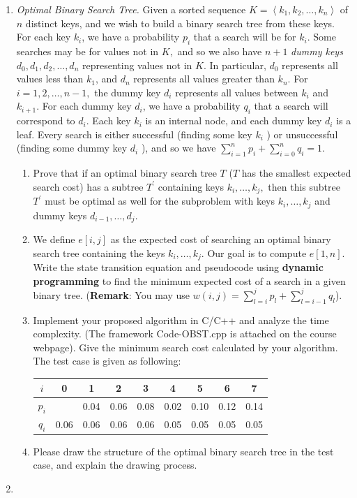 \documentclass[12pt,a4paper]{article}
\makeatletter
\newtheorem*{solution}{Solution}
\theoremstyle{definition}
\renewenvironment{solution}[1][Solution] {\par\pushQED{\qed}\normalfont\topsep6\p@\@plus6\p@\relax\trivlist\item[\hskip\labelsep\bfseries#1\@addpunct{.}]\ignorespaces}{\popQED\endtrivlist\@endpefalse} \makeatother
\makeatother
\begin{document}
	\begin{enumerate}
		\item \textit{Optimal Binary Search Tree.} Given a sorted sequence $K=\left \langle k_{1}, k_{2}, \ldots, k_{n} \right \rangle$ of $n$ distinct keys, and we wish to build a binary search tree from these keys. For each key $k_{i}$, we have a probability $p_{i}$ that a search will be for $k_{i}$. Some searches may be for values not in $K,$ and so we also have $n+1$ \emph{dummy keys} $d_{0}, d_{1}, d_{2}, \ldots, d_{n}$ representing values not in $K$. In particular, $d_{0}$ represents all values less than $k_{1}$, and $d_{n}$ represents all values greater than $k_{n}$. For $i=1,2, \ldots, n-1,$ the dummy key $d_{i}$ represents all values between $k_{i}$ and $k_{i+1}$. For each dummy key $d_{i}$, we have a probability $q_{i}$ that a search will correspond to $d_{i}$. Each key $k_{i}$ is an internal node, and each dummy key $d_{i}$ is a leaf. Every search is either successful (finding some key $k_{i}$ ) or unsuccessful (finding some dummy key $d_{i}$ ), and so we have $ \sum_{i=1}^{n} p_{i}+\sum_{i=0}^{n} q_{i}=1 $. 
		\begin{enumerate}
			\item Prove that if an optimal binary search tree $T$ ($ T $ has the smallest expected search cost) has a subtree $T^{\prime}$ containing keys $k_{i}, \ldots, k_{j},$ then this subtree $T^{\prime}$ must be optimal as well for the subproblem with keys $k_{i}, \ldots, k_{j}$ and dummy keys $d_{i-1}, \ldots, d_{j}$. 
			\item We define $e[i, j]$ as the expected cost of searching an optimal binary search tree containing the keys $k_{i}, \ldots, k_{j} .$ Our goal is to compute $e[1, n]$. Write the state transition equation and pseudocode using \textbf{dynamic programming} to find
			the minimum expected cost of a search in a given binary tree. (\textbf{Remark}: You may use $ w(i, j)=\sum_{l=i}^{j} p_{l}+\sum_{l=i-1}^{j} q_{l} $).
			\item Implement your proposed algorithm in C/C++ and analyze the time complexity. ({\color{blue}The framework Code-OBST.cpp is attached on the course webpage}). Give the minimum search cost calculated by your algorithm. The test case is given as following:
			\begin{table}[H]
				\setlength{\abovecaptionskip}{0cm}
				\setlength{\belowcaptionskip}{0.1cm}
				\centering		
				\begin{tabular}{|c|cccccccc|}
					\hline
					$ i $&0&1&2&3&4&5&6&7\\
					\hline
					$ p_{i} $&&0.04&0.06&0.08&0.02&0.10&0.12&0.14\\
					\hline
					$ q_{i} $&0.06&0.06&0.06&0.06&0.05&0.05&0.05&0.05\\
					\hline
				\end{tabular}
			\end{table}
			\item Please draw the structure of the optimal binary search tree in the test case, and explain the drawing process.   
		\end{enumerate}
		    \begin{solution}
		        

\end{solution}
\end{enumerate}
\end{document}
